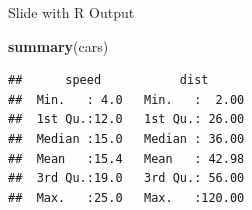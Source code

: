 \documentclass[
  ignorenonframetext,
  aspectratio=169,
  xcolor=dvipsnames]{beamer}
\newenvironment{Shaded}{\begin{snugshade}}{\end{snugshade}}
\newcommand{\FunctionTok}[1]{\textcolor[rgb]{0.13,0.29,0.53}{\textbf{#1}}}
\newcommand{\NormalTok}[1]{#1}
\let\oldShaded\Shaded
\let\endoldShaded\endShaded
\renewenvironment{Shaded}{\footnotesize\oldShaded}{\endoldShaded}
\begin{document}
\begin{frame}{}
\protect{}\label{section-10}
\end{frame}

\begin{frame}[fragile]{Slide with R Output}
\protect{}\label{slide-with-r-output}
\begin{Shaded}
\begin{Highlighting}[]
\FunctionTok{summary}\NormalTok{(cars)}
\end{Highlighting}
\end{Shaded}

\begin{verbatim}
##      speed           dist       
##  Min.   : 4.0   Min.   :  2.00  
##  1st Qu.:12.0   1st Qu.: 26.00  
##  Median :15.0   Median : 36.00  
##  Mean   :15.4   Mean   : 42.98  
##  3rd Qu.:19.0   3rd Qu.: 56.00  
##  Max.   :25.0   Max.   :120.00
\end{verbatim}
\end{frame}
\end{document}
